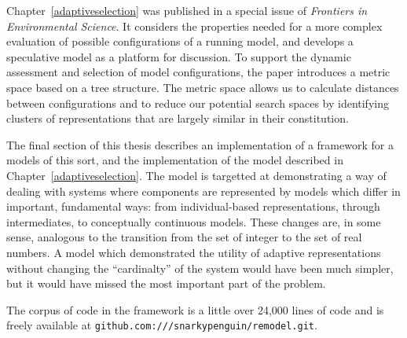 Chapter~\ref{adaptiveselection} was published in a special issue
of \emph{Frontiers in Environmental Science\/}. It considers the 
properties needed for a more complex evaluation of possible
configurations of a running model, and develops a speculative model as
a platform for discussion.  To support the dynamic assessment and
selection of model configurations, the paper introduces a metric space
based on a tree structure. The metric space allows us to calculate
distances between configurations and to reduce our potential search
spaces by identifying clusters of representations that are largely
similar in their constitution.


The final section of this thesis describes an implementation of a
framework for a models of this sort, and the implementation of the
model described in Chapter~\ref{adaptiveselection}. The model is
targetted at demonstrating a way of dealing with systems where
components are represented by models which differ in important,
fundamental ways: from individual-based representations, through
intermediates, to conceptually continuous models. These changes are,
in some sense, analogous to the transition from the set of integer to
the set of real numbers.  A model which demonstrated the utility of
adaptive representations without changing the ``cardinalty'' of the
system would have been much simpler, but it would have missed the most
important part of the problem.

The corpus of code in the framework is a little over 24,000 lines of
\Scheme code and is freely available
at \texttt{github.com:///snarkypenguin/remodel.git}.



